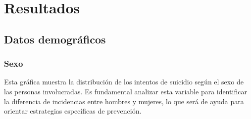\documentclass[
]{article}
\newenvironment{Shaded}{\begin{snugshade}}{\end{snugshade}}
\newcommand{\AttributeTok}[1]{\textcolor[rgb]{0.13,0.29,0.53}{#1}}
\newcommand{\DecValTok}[1]{\textcolor[rgb]{0.00,0.00,0.81}{#1}}
\newcommand{\FloatTok}[1]{\textcolor[rgb]{0.00,0.00,0.81}{#1}}
\newcommand{\FunctionTok}[1]{\textcolor[rgb]{0.13,0.29,0.53}{\textbf{#1}}}
\newcommand{\NormalTok}[1]{#1}
\newcommand{\OtherTok}[1]{\textcolor[rgb]{0.56,0.35,0.01}{#1}}
\newcommand{\SpecialCharTok}[1]{\textcolor[rgb]{0.81,0.36,0.00}{\textbf{#1}}}
\newcommand{\StringTok}[1]{\textcolor[rgb]{0.31,0.60,0.02}{#1}}
\begin{document}
\begin{Shaded}
\end{Shaded}

\section{\texorpdfstring{\textbf{Resultados}}{Resultados}}\label{resultados}

\subsection{Datos demográficos}\label{datos-demogruxe1ficos}

\subsubsection{Sexo}\label{sexo}

Esta gráfica muestra la distribución de los intentos de suicidio según
el sexo de las personas involucradas. Es fundamental analizar esta
variable para identificar la diferencia de incidencias entre hombres y
mujeres, lo que será de ayuda para orientar estrategias específicas de
prevención.

\begin{Shaded}
\end{Shaded}
\end{document}
